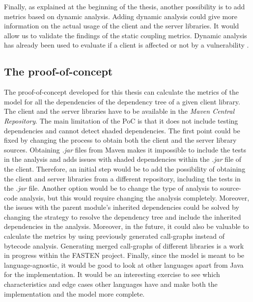 Finally, as explained at the beginning of the thesis, another possibility is to add metrics based on dynamic analysis. Adding dynamic analysis could give more information on the actual usage of the client and the server libraries. It would allow us to validate the findings of the static coupling metrics. Dynamic analysis has already been used to evaluate if a client is affected or not by a vulnerability \cite{plate2015impact}.

\subsection{The proof-of-concept}

The proof-of-concept developed for this thesis can calculate the metrics of the model for all the dependencies of the dependency tree of a given client library. The client and the server libraries have to be available in the \textit{Maven Central Repository}. The main limitation of the PoC is that it does not include testing dependencies and cannot detect shaded dependencies. The first point could be fixed by changing the process to obtain both the client and the server library sources. Obtaining \textit{.jar} files from Maven makes it impossible to include the tests in the analysis and adds issues with shaded dependencies within the \textit{.jar} file of the client. Therefore, an initial step would be to add the possibility of obtaining the client and server libraries from a different repository, including the tests in the \textit{.jar} file. Another option would be to change the type of analysis to source-code analysis, but this would require changing the analysis completely. Moreover, the issues with the parent module's inherited dependencies could be solved by changing the strategy to resolve the dependency tree and include the inherited dependencies in the analysis.
Moreover, in the future, it could also be valuable to calculate the metrics by using previously generated call-graphs instead of bytecode analysis. Generating merged call-graphs of different libraries is a work in progress within the FASTEN project. Finally, since the model is meant to be language-agnostic, it would be good to look at other languages apart from Java for the implementation. It would be an interesting exercise to see which characteristics and edge cases other languages have and make both the implementation and the model more complete.
